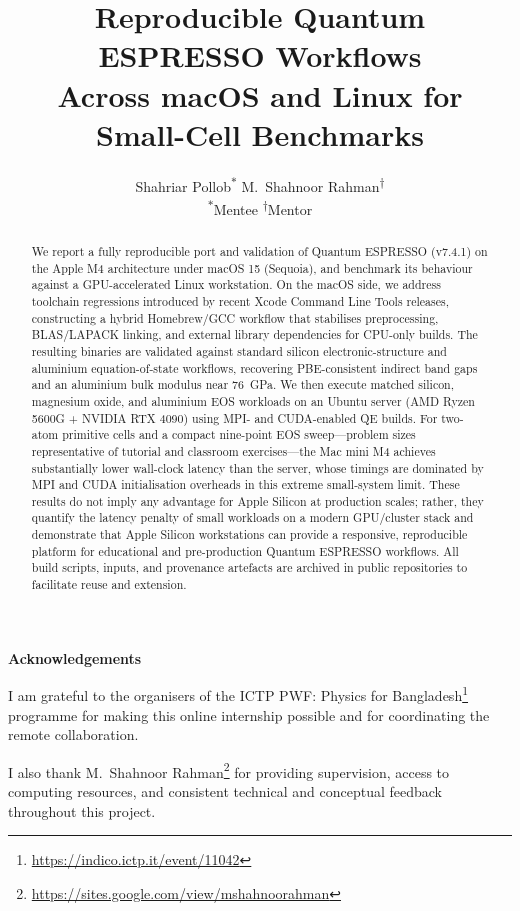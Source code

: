 \documentclass[12pt]{article}
\title{Reproducible Quantum ESPRESSO Workflows\\Across macOS and Linux for Small-Cell Benchmarks}
\author{Shahriar Pollob\textsuperscript{$\ast$} \quad M.~Shahnoor Rahman\textsuperscript{$\dagger$}\\[0.5em]\small \textsuperscript{$\ast$}Mentee \quad \textsuperscript{$\dagger$}Mentor}
\date{}
\begin{document}
\maketitle
\thispagestyle{empty}

\begin{abstract}
We report a fully reproducible port and validation of Quantum ESPRESSO (v7.4.1) on the Apple M4 architecture under macOS 15 (Sequoia), and benchmark its behaviour against a GPU-accelerated Linux workstation. On the macOS side, we address toolchain regressions introduced by recent Xcode Command Line Tools releases, constructing a hybrid Homebrew/GCC workflow that stabilises preprocessing, BLAS/LAPACK linking, and external library dependencies for CPU-only builds. The resulting binaries are validated against standard silicon electronic-structure and aluminium equation-of-state workflows, recovering PBE-consistent indirect band gaps and an aluminium bulk modulus near 76~GPa. We then execute matched silicon, magnesium oxide, and aluminium EOS workloads on an Ubuntu server (AMD Ryzen 5600G + NVIDIA RTX 4090) using MPI- and CUDA-enabled QE builds. For two-atom primitive cells and a compact nine-point EOS sweep—problem sizes representative of tutorial and classroom exercises—the Mac mini M4 achieves substantially lower wall-clock latency than the server, whose timings are dominated by MPI and CUDA initialisation overheads in this extreme small-system limit. These results do not imply any advantage for Apple Silicon at production scales; rather, they quantify the latency penalty of small workloads on a modern GPU/cluster stack and demonstrate that Apple Silicon workstations can provide a responsive, reproducible platform for educational and pre-production Quantum ESPRESSO workflows. All build scripts, inputs, and provenance artefacts are archived in public repositories to facilitate reuse and extension.
\end{abstract}

\newpage
\thispagestyle{plain}
\vspace*{1em}
\begin{center}
{\Large\bfseries Acknowledgements}
\end{center}

I am grateful to the organisers of the ICTP PWF: Physics for Bangladesh\footnote{\url{https://indico.ictp.it/event/11042}} programme for making this online internship possible and for coordinating the remote collaboration.

\vspace*{1em}
I also thank M.~Shahnoor Rahman\footnote{\url{https://sites.google.com/view/mshahnoorahman}} for providing supervision, access to computing resources, and consistent technical and conceptual feedback throughout this project.
\end{document}
